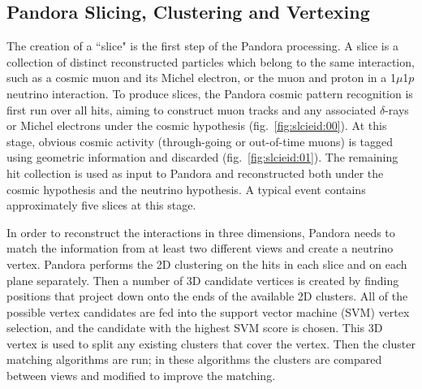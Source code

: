 \subsection{Pandora Slicing, Clustering and Vertexing}
The creation of a ``slice" is the first step of the Pandora processing. A slice is a collection of distinct reconstructed particles which belong to the same interaction, such as a cosmic muon and its Michel electron, or the muon and proton in a 1$\mu$1$p$ neutrino interaction. To produce slices, the Pandora cosmic pattern recognition is first run over all hits, aiming to construct muon tracks and any associated $\delta$-rays or Michel electrons under the cosmic hypothesis (fig.~\ref{fig:slcieid:00}). At this stage, obvious cosmic activity (through-going or out-of-time muons) is tagged using geometric information and discarded (fig.~\ref{fig:slcieid:01}). The remaining hit collection is used as input to Pandora and reconstructed both under the cosmic hypothesis and the neutrino hypothesis. A typical event contains approximately five slices at this stage. 

\par In order to reconstruct the interactions in three dimensions, Pandora needs to match the information from at least two different views and create a neutrino vertex. Pandora performs the 2D clustering on the hits in each slice and on each plane separately. Then a number of 3D candidate vertices is created by finding positions that project down onto the ends of the available 2D clusters. All of the possible vertex candidates are fed into the support vector machine (SVM) vertex selection, and the candidate with the highest SVM score is chosen. This 3D vertex is used to split any existing clusters that cover the vertex. Then the cluster matching algorithms are run; in these algorithms the clusters are compared between views and modified to improve the matching.

